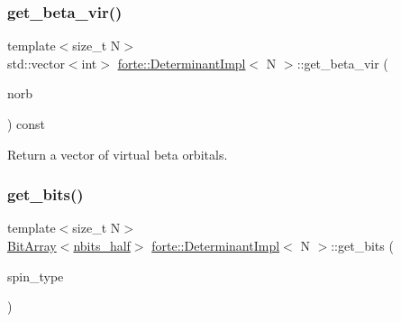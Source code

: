 \subsubsection{\texorpdfstring{get\+\_\+beta\+\_\+vir()}{get\_beta\_vir()}}
{\footnotesize\ttfamily template$<$size\+\_\+t N$>$ \\
std\+::vector$<$int$>$ \mbox{\hyperlink{classforte_1_1_determinant_impl}{forte\+::\+Determinant\+Impl}}$<$ N $>$\+::get\+\_\+beta\+\_\+vir (\begin{DoxyParamCaption}\item[{int}]{norb }\end{DoxyParamCaption}) const\hspace{0.3cm}{\ttfamily [inline]}}



Return a vector of virtual beta orbitals. 

\mbox{\label{classforte_1_1_determinant_impl_a924606ae7e4855ccb197fc3e5bec7028}} 
\subsubsection{\texorpdfstring{get\+\_\+bits()}{get\_bits()}}
{\footnotesize\ttfamily template$<$size\+\_\+t N$>$ \\
\mbox{\hyperlink{classforte_1_1_bit_array}{Bit\+Array}}$<$\mbox{\hyperlink{classforte_1_1_determinant_impl_ac8d2a64c2fb785ccb79b1cecc553d63d}{nbits\+\_\+half}}$>$ \mbox{\hyperlink{classforte_1_1_determinant_impl}{forte\+::\+Determinant\+Impl}}$<$ N $>$\+::get\+\_\+bits (\begin{DoxyParamCaption}\item[{\mbox{\hyperlink{namespaceforte_acb88fa63430aae4a1b15c7be9c55f179}{Det\+Spin\+Type}}}]{spin\+\_\+type }\end{DoxyParamCaption})\hspace{0.3cm}{\ttfamily [inline]}}

\mbox{\label{classforte_1_1_determinant_impl_afc9e7b4d9b3ec24a97ca3793272ce595}} 
